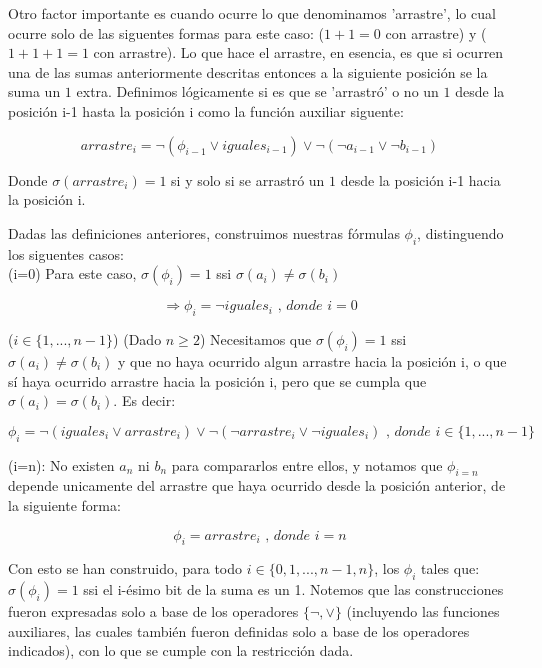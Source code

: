 \documentclass[
	spanish, %
	letterpaper, oneside
]{article}
\begin{document}
Otro factor importante es cuando ocurre lo que denominamos 'arrastre', lo cual ocurre solo de las siguentes formas para este caso:
($1 + 1 = 0$ con arrastre) y ($1 + 1 + 1 = 1$ con arrastre). Lo que hace el arrastre, en esencia, es que si ocurren una de las sumas anteriormente descritas entonces a la siguiente posición se la suma un $1$ extra. Definimos lógicamente si es que se 'arrastró' o no un $1$ desde la posición i-1 hasta la posición i como la función auxiliar siguente:

$$arrastre_i =  \neg ( \phi_{i-1} \vee iguales _{i-1} ) \vee \neg(\neg a_{i-1} \vee \neg b_{i-1}) $$


Donde $\sigma(arrastre_i) = 1$ si y solo si se arrastró un $1$ desde la posición i-1 hacia la posición i. 

\vspace{5mm}

Dadas las definiciones anteriores, construimos nuestras fórmulas $\phi_i$, distinguendo los siguentes casos:\\

 (i=0) Para este caso, $\sigma(\phi_i) = 1$ ssi $\sigma(a_i) \neq \sigma(b_i)$

$$\Rightarrow \phi_i = \neg iguales_i \textit{ , donde } i=0$$

 ($i\in \{1,...,n-1\}$) (Dado $n\geq2$) Necesitamos que $\sigma(\phi_i) = 1$ ssi  $\sigma(a_i) \neq \sigma(b_i)$ y que no haya ocurrido algun arrastre hacia la posición i, o que sí haya ocurrido arrastre hacia la posición i, pero que se cumpla que $\sigma(a_i) = \sigma(b_i)$. Es decir:

$$\phi_i = \neg(iguales_i \vee arrastre_i) \vee \neg( \neg arrastre_i  \vee \neg iguales_i ) \textit{ , donde } i\in \{1,...,n-1\}$$

 (i=n): No existen $a_n$ ni $b_n$ para compararlos entre ellos, y notamos que $\phi_{i=n}$ depende unicamente del arrastre que haya ocurrido desde la posición anterior, de la siguiente forma:

$$\phi_i = arrastre_i \textit{ , donde } i=n$$

Con esto se han construido, para todo $i \in \{0,1,...,n-1,n\}$, los $\phi_i$ tales que: $\sigma(\phi_i) = 1$ ssi el i-ésimo bit de la suma es un 1. Notemos que las construcciones fueron expresadas solo a base de los operadores $\{\neg,\vee\}$ (incluyendo las funciones auxiliares, las cuales también fueron definidas solo a base de los operadores indicados), con lo que se cumple con la restricción dada.
\end{document}
